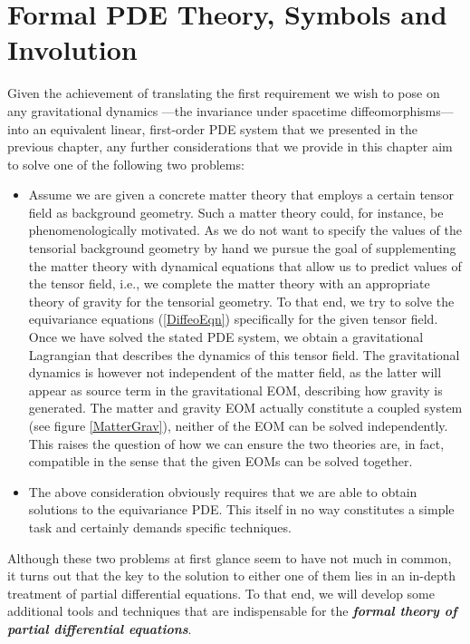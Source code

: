 \section{Formal PDE Theory, Symbols and Involution}
Given the achievement of translating the first requirement we wish to pose on any gravitational dynamics ---the invariance under spacetime diffeomorphisms--- into an equivalent linear, first-order PDE system that we presented in the previous chapter, any further considerations that we provide in this chapter aim to solve one of the following two problems:
\begin{itemize}
    \item Assume we are given a concrete matter theory that employs a certain tensor field as background geometry.
    Such a matter theory could, for instance, be phenomenologically motivated. As we do not want to specify the values of the tensorial background geometry by hand we pursue the goal of supplementing the matter theory with dynamical equations that allow us to predict values of the tensor field, i.e., we complete the matter theory with an appropriate theory of gravity for the tensorial geometry. To that end, we try to solve the equivariance equations (\ref{DiffeoEqn}) specifically for the given tensor field. 
    Once we have solved the stated PDE system, we obtain a gravitational Lagrangian that describes the dynamics of this tensor field. The gravitational dynamics is however not independent of the matter field, as the latter will appear as source term in the gravitational EOM, describing how gravity is generated.
    The matter and gravity EOM actually constitute a coupled system (see figure \ref{MatterGrav}), neither of the EOM can be solved independently. This raises the question of how we can ensure the two theories are, in fact, compatible in the sense that the given EOMs can be solved together.
    \item The above consideration obviously requires that we are able to obtain solutions to the equivariance PDE. This itself in no way constitutes a simple task and certainly demands specific techniques.
\end{itemize}
Although these two problems at first glance seem to have not much in common, it turns out that the key to the solution to either one of them lies in an in-depth treatment of partial differential equations. 
To that end, we will develop some additional tools and techniques that are indispensable for the  \textit{\textbf{formal theory of partial differential equations}}.

